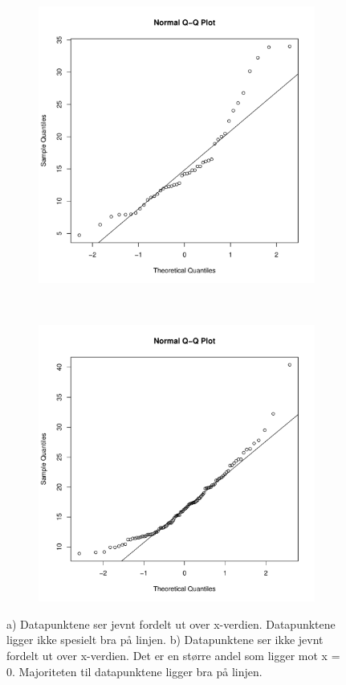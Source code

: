 \begin{figure}[H]
    \centering
    \begin{subfigure}{0.5\textwidth}
        \centering
        \includegraphics[width=\linewidth]{LETT.pdf}
        \caption{}
    \end{subfigure}%
    ~
    \begin{subfigure}{0.5\textwidth}
        \centering
        \includegraphics[width=\linewidth]{TUNGT.pdf}
        \caption{}
    \end{subfigure}
    \caption{a) Datapunktene ser jevnt fordelt ut over x-verdien. Datapunktene ligger ikke spesielt bra på linjen. b) Datapunktene ser ikke jevnt fordelt ut over x-verdien. Det er en større andel som ligger mot x = 0. Majoriteten til datapunktene ligger bra på linjen. }
    \label{fig:2G}
\end{figure}

